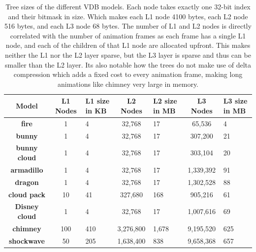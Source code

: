 \begin{table}[htbp]
    \centering
    \begin{tabularx}{\textwidth}{|c|c|X|c|X|c|X|}
    \hline
    \textbf{Model} & \textbf{L1 Nodes} & \textbf{L1 size in KB} & \textbf{L2 Nodes} & \textbf{L2 size in MB} & \textbf{L3 Nodes} & \textbf{L3 size in MB} \\
    \hline
    \textbf{fire} & 1 & 4 & 32,768 & 17 & 65,536 & 4\\
    \hline
    \textbf{bunny} & 1 & 4 & 32,768 & 17 & 307,200 & 21\\
    \hline
    \textbf{bunny cloud} & 1 & 4 & 32,768 & 17 & 303,104 & 20\\
    \hline
    \textbf{armadillo} & 1 & 4 & 32,768 & 17 & 1,339,392 & 91\\
    \hline
    \textbf{dragon} & 1 & 4 & 32,768 & 17 & 1,302,528 & 88\\
    \hline
    \textbf{cloud pack} & 10 & 41 & 327,680 & 168 & 905,216 & 61\\
    \hline
    \textbf{Disney cloud} & 1 & 4 & 32,768 & 17 & 1,007,616 & 69\\
    \hline
    \textbf{chimney} & 100 & 410 & 3,276,800 & 1,678 & 9,195,520 & 625\\
    \hline
    \textbf{shockwave} & 50 & 205 & 1,638,400 & 838 & 9,658,368 & 657\\
    \hline
    \end{tabularx}
    \caption{Tree sizes of the different VDB models. Each node takes exactly one 32-bit index and their bitmask in size. Which makes each L1 node 4100 bytes, each L2 node 516 bytes, and each L3 node 68 bytes. The number of L1 and L2 nodes is directly correlated with the number of animation frames as each frame has a single L1 node, and each of the children of that L1 node are allocated upfront. This makes neither the L1 nor the L2 layer sparse, but the L3 layer is sparse and thus can be smaller than the L2 layer. Its also notable how the trees do not make use of delta compression which adds a fixed cost to every animation frame, making long animations like chimney very large in memory.}
    \label{tab:tree_sizes}
\end{table}

